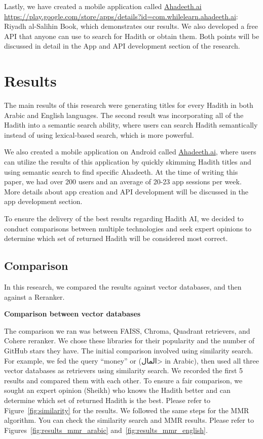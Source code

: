 \documentclass{svproc}
\begin{document}
Lastly, we have created a mobile application called \href{http://ahadeeth.ai/}{Ahadeeth.ai} \url{https://play.google.com/store/apps/details?id=com.whilelearn.ahadeeth.ai}: Riyadh al-Salihin Book, which demonstrates our results. We also developed a free API that anyone can use to search for Hadith or obtain them. Both points will be discussed in detail in the App and API development section of the research.


\section*{Results}

The main results of this research were generating titles for every Hadith in both Arabic and English languages. The second result was incorporating all of the Hadith into a semantic search ability, where users can search Hadith semantically instead of using lexical-based search, which is more powerful.

We also created a mobile application on Android called \href{http://ahadeeth.ai/}{Ahadeeth.ai}, where users can utilize the results of this application by quickly skimming Hadith titles and using semantic search to find specific Ahadeeth. At the time of writing this paper, we had over 200 users and an average of 20-23 app sessions per week. More details about app creation and API development will be discussed in the app development section.

To ensure the delivery of the best results regarding Hadith AI, we decided to conduct comparisons between multiple technologies and seek expert opinions to determine which set of returned Hadith will be considered most correct.

\subsection{Comparison}

In this research, we compared the results against vector databases, and then against a Reranker.

\textbf{Comparison between vector databases}

The comparison we ran was between FAISS, Chroma, Quadrant retrievers, and Cohere reranker. We chose these libraries for their popularity and the number of GitHub stars they have. The initial comparison involved using similarity search. For example, we fed the query “money” or 
(\<المال> in Arabic), then used all three vector databases as retrievers using similarity search. We recorded the first 5 results and compared them with each other. To ensure a fair comparison, we sought an expert opinion (Sheikh) who knows the Hadith better and can determine which set of returned Hadith is the best. Please refer to Figure~\ref{fig:similarity} for the results. We followed the same steps for the MMR algorithm. You can check the similarity search and MMR results. Please refer to Figures~\ref{fig:results_mmr_arabic} and~\ref{fig:results_mmr_english}.
\end{document}
